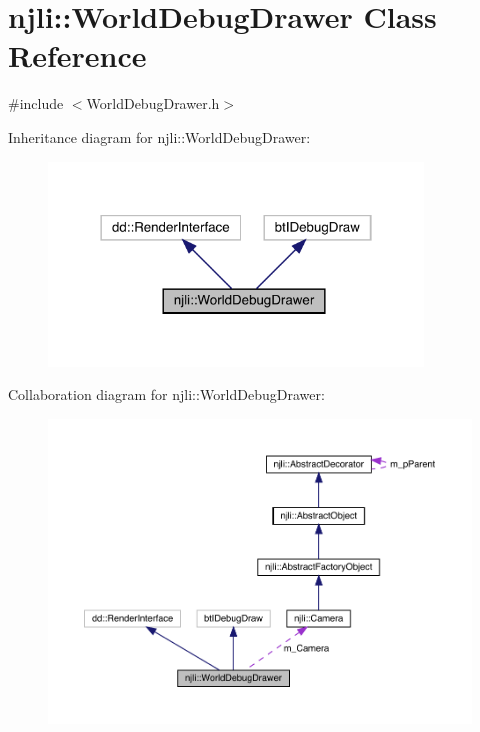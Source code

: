 \hypertarget{classnjli_1_1_world_debug_drawer}{}\section{njli\+:\+:World\+Debug\+Drawer Class Reference}
\label{classnjli_1_1_world_debug_drawer}


{\ttfamily \#include $<$World\+Debug\+Drawer.\+h$>$}



Inheritance diagram for njli\+:\+:World\+Debug\+Drawer\+:\nopagebreak
\begin{figure}[H]
\begin{center}
\leavevmode
\includegraphics[width=282pt]{classnjli_1_1_world_debug_drawer__inherit__graph}
\end{center}
\end{figure}


Collaboration diagram for njli\+:\+:World\+Debug\+Drawer\+:\nopagebreak
\begin{figure}[H]
\begin{center}
\leavevmode
\includegraphics[width=350pt]{classnjli_1_1_world_debug_drawer__coll__graph}
\end{center}
\end{figure}
